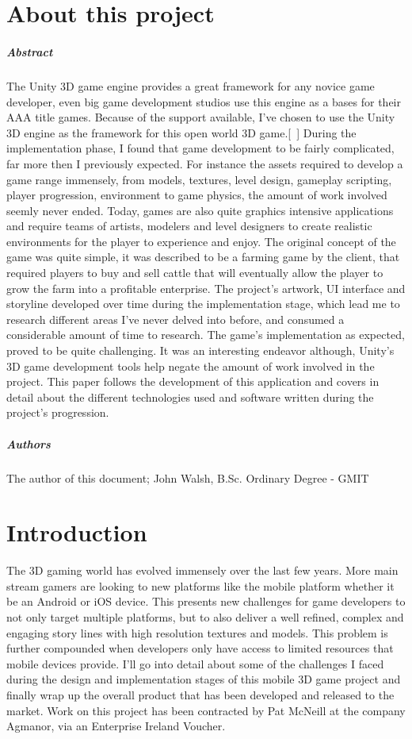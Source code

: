 \chapter*{About this project}
\paragraph{Abstract}
The Unity 3D game engine provides a great framework for any novice game developer, even big game development studios use this engine as a bases for their AAA title games. Because of the support available, I've chosen to use the Unity 3D engine as the framework for this open world 3D game.[~\cite{Unity3D}] During the implementation phase, I found that game development to be fairly complicated, far more then I previously expected. For instance the assets required to develop a game range immensely, from models, textures, level design, gameplay scripting, player progression, environment to game physics, the amount of work involved seemly never ended. Today, games are also quite graphics intensive applications and require teams of artists, modelers and level designers to create realistic environments for the player to experience and enjoy. 
The original concept of the game was quite simple, it was described to be a farming game by the client, that required players to buy and sell cattle that will eventually allow the player to grow the farm into a profitable enterprise. The project's artwork, UI interface and storyline developed over time during the implementation stage, which lead me to research different areas I've never delved into before, and consumed a considerable amount of time to research. The game's implementation as expected, proved to be quite challenging. It was an interesting endeavor although, Unity's 3D game development tools help negate the amount of work involved in the project. This paper follows the development of this application and covers in detail about the different technologies used and software written during the project's progression.
\paragraph{Authors}
The author of this document; John Walsh, B.Sc. Ordinary Degree - GMIT
\chapter{Introduction}
The 3D gaming world has evolved immensely over the last few years. More main stream gamers are looking to new platforms like the mobile platform whether it be an Android or iOS device. This presents new challenges for game developers to not only target multiple platforms, but to also deliver a well refined, complex and engaging story lines with high resolution textures and models. This problem is further compounded when developers only have access to limited resources that mobile devices provide. I'll go into detail about some of the challenges I faced during the design and implementation stages of this mobile 3D game project and finally wrap up the overall product that has been developed and released to the market. Work on this project has been contracted by Pat McNeill at the company Agmanor, via an Enterprise Ireland Voucher.
